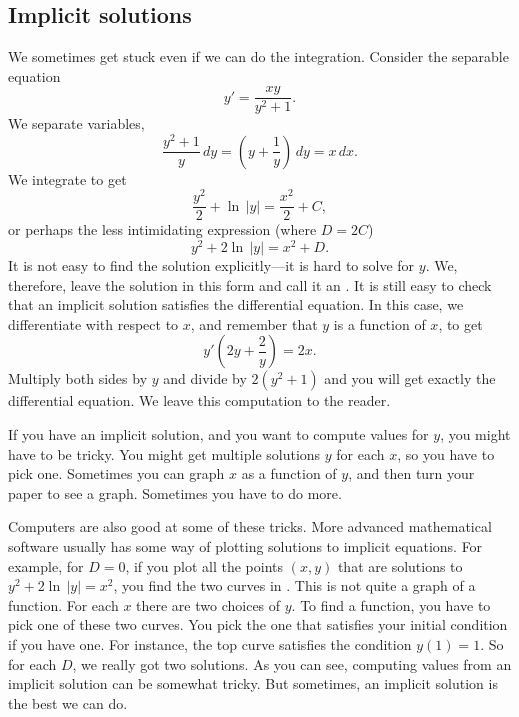 \subsection{Implicit solutions}

We sometimes get stuck even if we can do the
integration.  Consider the separable equation
\begin{equation*}
y' = \frac{xy}{y^2+1} .
\end{equation*}
We separate variables,
\begin{equation*}
\frac{y^2+1}{y}\,dy = \left(y+\frac{1}{y}\right)\,dy = x\,dx .
\end{equation*}
We integrate to get
\begin{equation*}
\frac{y^2}{2} + \ln \, \lvert y \rvert = \frac{x^2}{2} + C ,
\end{equation*}
or perhaps the less intimidating expression (where $D = 2C$)
\begin{equation*}
y^2 + 2 \ln \, \lvert y\rvert = x^2 + D .
\end{equation*}
It is not easy to find the solution explicitly---it is hard to solve
for $y$.  We, therefore, leave the solution in this form and call
it an
\emph{}.
It is still
easy to check that an implicit solution satisfies the differential
equation.  In this case, we differentiate with respect to $x$, and remember
that $y$ is a function of $x$,
to get
\begin{equation*}
y'\left(2y + \frac{2}{y}\right) = 2x .
\end{equation*}
Multiply both sides by $y$ and divide by $2(y^2+1)$ and you will
get exactly the differential equation.  We leave this computation to the
reader.

If you have an implicit solution, and
you want to compute values
for $y$, you might have to be tricky.  You might get multiple solutions $y$
for each $x$, so you have to pick one.  Sometimes you can
graph $x$ as a function of $y$, and then turn your paper to
see a graph.
Sometimes you have to do more.

Computers are also good at some of these tricks.
More advanced mathematical software usually has some
way of plotting solutions to implicit equations.
For example, for $D=0$, if you plot all the points $(x,y)$ that
are solutions to $y^2+2\ln \, \lvert y\rvert=x^2$,
you find the two curves in .  This is not quite
a graph of a function. For each $x$ there are two choices of $y$.
To find a function, you have to pick one of these two curves.
You pick the one that satisfies your initial condition if you have one.
For instance, the top curve satisfies the condition $y(1)=1$.
So for each $D$, we really got two solutions.
As you can see, computing values from an implicit solution can be somewhat
tricky.  But sometimes, an implicit solution is the best we can do.

